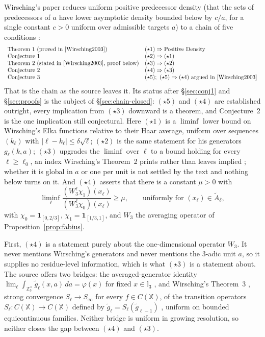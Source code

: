 \documentclass[11pt]{article}
\theoremstyle{definition}
\theoremstyle{remark}
\begin{document}
Wirsching's paper reduces uniform positive predecessor density (that
the sets of predecessors of $a$ have lower asymptotic density bounded
below by $c/a$, for a single constant $c>0$ uniform over admissible
targets $a$) to a chain of five conditions
\cite[Definition~1, \S\S1--7]{Wirsching2003}:
\[
\begin{array}{ll}
\text{Theorem 1 (proved in \cite{Wirsching2003})} & (\star1)\Rightarrow
  \text{Positive Density}\\
\text{Conjecture~1} & (\star2)\Rightarrow(\star1)\\
\text{Theorem 2 (stated in \cite{Wirsching2003}, proof below)} & (\star3)\Rightarrow(\star2)\\
\text{Conjecture~2} & (\star4)\Rightarrow(\star3)\\
\text{Conjecture~3} & (\star5);\ (\star5)\Rightarrow(\star4)\text{ argued in
  \cite[\S7]{Wirsching2003}}
\end{array}
\]
That is the chain as the source leaves it. Its status after
\S\ref{sec:conj1} and \S\ref{sec:proofs} is the subject of
\S\ref{sec:chain-closed}: $(\star5)$ and $(\star4)$ are established
outright, every implication from $(\star3)$ downward is a theorem, and
Conjecture~2 is the one implication still conjectural. Here $(\star1)$ is a $\liminf$ lower bound on Wirsching's Elka functions
relative to their Haar average, uniform over sequences
$(k_\ell)$ with $|\ell-k_\ell|\le\delta\sqrt\ell$; $(\star2)$ is the same
statement for his generators $g_\ell(k,a)$; $(\star3)$ upgrades the
$\liminf$ over $\ell$ to a bound holding for every $\ell\ge\ell_0$, an
index Wirsching's Theorem~2 prints rather than leaves implied
\cite[\S3, p.~780]{Wirsching2003}; whether it is global in $a$ or one
per unit is not settled by the text and nothing below turns on it. And
$(\star4)$ asserts that there is a constant $\mu>0$ with
\[
 \liminf_\ell\frac{(W_3^\ell\chi_1)(x_\ell)}{(W_3^\ell\chi_0)(x_\ell)}
 \ge\mu,\qquad\text{uniformly for }(x_\ell)\in\widetilde A_\delta,
\]
with $\chi_0=\mathbf 1_{[0,2/3]}$, $\chi_1=\mathbf1_{[1/3,1]}$, and
$W_3$ the averaging operator of Proposition~\ref{prop:fabius}.

First, $(\star4)$ is a statement purely about the one-dimensional operator
$W_3$. It never mentions Wirsching's generators and never mentions the
$3$-adic unit $a$, so it supplies no residue-level information, which
is what $(\star3)$ is a statement about. The
source offers two bridges: the averaged-generator
identity $\lim_\ell\int_{\mathbb Z_3^\times}\widetilde g_\ell(x,a)\,da=
\varphi(x)$ for fixed $x\in\mathbb I_3$ \cite[\S6]{Wirsching2003}, and
Wirsching's Theorem~3 \cite[\S5]{Wirsching2003}, strong convergence
$S_\ell\to S_\infty$ for every $f\in C(\mathbb X)$, of the
transition operators $S_\ell:C(\mathbb X)\to C(\mathbb X)$ defined by
$\widetilde g_\ell=S_\ell(\widetilde g_{\ell-1})$
\cite[\S4]{Wirsching2003}, uniform on
bounded equicontinuous families. Neither bridge is uniform in growing
resolution, so neither closes the gap between $(\star4)$ and $(\star3)$.
\end{document}
